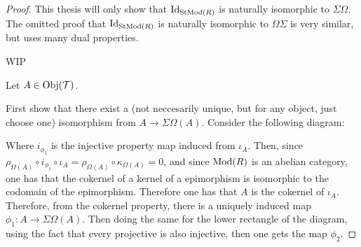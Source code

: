 \begin{proof}
    This thesis will only show that \( \operatorname{Id}_{\operatorname{StMod}(R)} \) is naturally isomorphic to \( \Sigma\Omega \). The omitted proof that \( \operatorname{Id}_{\operatorname{StMod}(R)} \) is naturally isomorphic to \( \Omega\Sigma \) is very similar, but uses many dual properties.

    WIP

    Let \( A \in \operatorname{Obj}({\mathcal{T}}) \).

    First show that there exist a (not neccesarily unique, but for any object, just choose one) isomorphism from \( A \to \Sigma\Omega(A) \). Consider the following diagram:

    \begin{center}
    \end{center}

    Where \( i_{\phi_1} \) is the injective property map induced from \( \iota_A \). Then, since \( \rho_{\Omega(A)} \circ i_{\phi_1} \circ \iota_A = \rho_{\Omega(A)} \circ \kappa_{\Omega(A)} = 0 \), and since \( \operatorname{Mod}(R) \) is an abelian category, one has that the cokernel of a kernel of a epimorphism is isomorphic to the codomain of the epimorphism. Therefore one has that \( A \) is the cokernel of \( \iota_A \). Therefore, from the cokernel property, there is a uniquely induced map \( \phi_1: A \to \Sigma\Omega(A) \). Then doing the same for the lower rectangle of the diagram, using the fact that every projective is also injective, then one gets the map \( \phi_2 \).


\end{proof}
